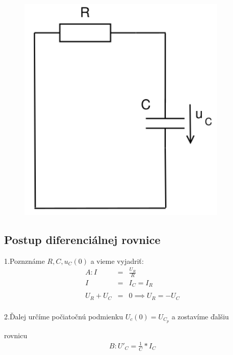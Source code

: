 \documentclass[a4paper,oneside,12pt]{article}
\begin{document}
\begin{figure}[h]
		\begin{center}
			\includegraphics[width=10cm]{circuit_5.png}
		\end{center}
\end{figure}

\maketitle
\subsection{Postup diferenciálnej rovnice}

1.Poznznáme $R,C,u_{C}(0)$ a vieme vyjadriť:
\begin{eqnarray*}
	A : I &= &  \frac{U_{R}}{R} \\
	I &= & I_{C} = I_{R} \\ \\
	U_{R} + U_{C} &= & 0 \implies U_{R} = -U_{C} \\
\end{eqnarray*}

2.Ďalej určíme počiatočnú podmienku $U_{c}(0) = U_{C_{p}}$ a zostavíme ďalšiu 

rovnicu
\begin{eqnarray*}
	B : U'_{C} = \frac{1}{C} * I_{C} \\
\end{eqnarray*}

\maketitle
\end{document}
